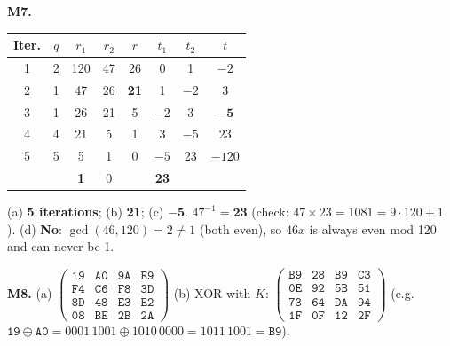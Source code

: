 \textbf{M7.}
\begin{center}\small
\begin{tabular}{@{}cccccccc@{}}
\toprule
Iter. & $q$ & $r_1$ & $r_2$ & $r$ & $t_1$ & $t_2$ & $t$\\
\midrule
1 & 2 & 120 & 47 & 26 & 0 & 1 & $-2$\\
2 & 1 & 47 & 26 & \textbf{21} & 1 & $-2$ & 3\\
3 & 1 & 26 & 21 & 5 & $-2$ & 3 & $\mathbf{-5}$\\
4 & 4 & 21 & 5 & 1 & 3 & $-5$ & 23\\
5 & 5 & 5 & 1 & 0 & $-5$ & 23 & $-120$\\
 & & \textbf{1} & 0 & & \textbf{23} & & \\
\bottomrule
\end{tabular}
\end{center}
(a) \textbf{5 iterations}; (b) \textbf{21}; (c) $\mathbf{-5}$. \;$47^{-1} = \mathbf{23}$ (check: $47 \times 23 = 1081 = 9\cdot120 + 1$ \checkmark).
(d) \textbf{No}: $\gcd(46, 120) = 2 \ne 1$ (both even), so $46x$ is always even mod 120 and can never be 1.

\textbf{M8.} (a) $\begin{pmatrix}\mathtt{19}&\mathtt{A0}&\mathtt{9A}&\mathtt{E9}\\\mathtt{F4}&\mathtt{C6}&\mathtt{F8}&\mathtt{3D}\\\mathtt{8D}&\mathtt{48}&\mathtt{E3}&\mathtt{E2}\\\mathtt{08}&\mathtt{BE}&\mathtt{2B}&\mathtt{2A}\end{pmatrix}$ \quad
(b) XOR with $K$: $\begin{pmatrix}\boldsymbol{\mathtt{B9}}&\boldsymbol{\mathtt{28}}&\boldsymbol{\mathtt{B9}}&\boldsymbol{\mathtt{C3}}\\\boldsymbol{\mathtt{0E}}&\boldsymbol{\mathtt{92}}&\boldsymbol{\mathtt{5B}}&\boldsymbol{\mathtt{51}}\\\boldsymbol{\mathtt{73}}&\boldsymbol{\mathtt{64}}&\boldsymbol{\mathtt{DA}}&\boldsymbol{\mathtt{94}}\\\boldsymbol{\mathtt{1F}}&\boldsymbol{\mathtt{0F}}&\boldsymbol{\mathtt{12}}&\boldsymbol{\mathtt{2F}}\end{pmatrix}$
\;(e.g.\ $\mathtt{19} \oplus \mathtt{A0} = 0001\,1001 \oplus 1010\,0000 = 1011\,1001 = \mathtt{B9}$).
